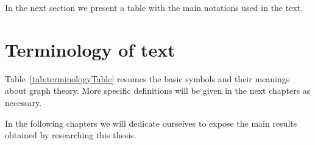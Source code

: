 In the next section we present a table with the main notations used in the text.


\section{Terminology of text}

Table~\ref{tab:terminologyTable} resumes the basic symbols and their meanings about graph theory.
More specific definitions will be given in the next chapters as necessary.



In the following chapters we will dedicate ourselves to expose the main results obtained by researching this thesis.